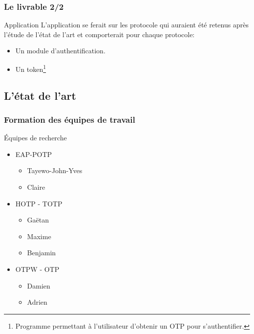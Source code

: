 \documentclass[xcolor=table]{beamer}
\begin{document}
\begin{frame}
\frametitle{Le livrable 2/2}
\begin{block}{Application}
    L'application se ferait sur les protocole qui auraient été retenus après l'étude de 
  l'état de l'art et comporterait pour chaque protocole:
  \begin{itemize}
    \item Un module d'authentification.
    \item Un token\footnote[1]{Programme permettant à l'utilisateur d'obtenir un 
      OTP pour s'authentifier.}
  \end{itemize}
\end{block}

\end{frame}

\subsection{L'état de l'art}
\begin{frame}
\frametitle{Formation des équipes de travail}
\begin{block}{Équipes de recherche}
  \begin{itemize}
    \item EAP-POTP
    \begin{itemize}
      \item Tayewo-John-Yves 
      \item Claire 
    \end{itemize}
    \item HOTP - TOTP
    \begin{itemize}
      \item Gaëtan 
      \item Maxime 
      \item Benjamin 
    \end{itemize}
    \item OTPW - OTP
    \begin{itemize}
      \item Damien 
      \item Adrien 
    \end{itemize}
  \end{itemize}
\end{block}
\end{frame}
\end{document}
